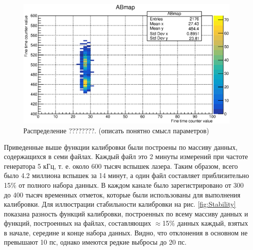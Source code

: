 \begin{figure}
\includegraphics[width=1.0\textwidth]{pictures/ABmap.eps}
\caption{Распределение ????????. (описать понятно смысл параметров)}
\label{fig:ABmap}
\end{figure}



Приведенные выше функции калибровки были построены по массиву данных, содержащихся в семи файлах. Каждый файл это 2 минуты измерений при частоте генератора 5 кГц, т. е. около 600 тысяч вспышек лазера. Таким образом, всего было 4.2 миллиона вспышек за 14 минут, а один файл составляет приблизительно 15\% от полного набора данных. В каждом канале было зарегистрировано от 300 до 400 тысяч временных отметок, которые были использованы для выполнения калибровки. Для иллюстрации стабильности калибровки на рис. \ref{fig:Stability} показана разность функций калибровки, построенных по всему массиву данных и функций, построенных на файлах, составляющих $ \approx $15\% данных каждый, взятых в начале, середине и конце набора данных. Видно, что отклонения в основном не превышают 10 пс, однако имеются редкие выбросы до 20 пс.

